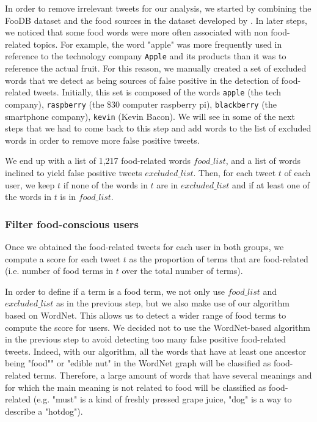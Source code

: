 \documentclass[letterpaper]{article}
\begin{document}
In order to remove irrelevant tweets for our analysis, we started by combining
the FooDB dataset and the food sources in the dataset developed by
\citeauthor{abbar2015you}. In later steps, we noticed that some food words were
more often associated with non food-related topics. For example, the word
"apple" was more frequently used in reference to the technology company
\verb+Apple+ and its products than it was to reference the actual fruit. For
this reason, we manually created a set of excluded words that we detect as being
sources of false positive in the detection of food-related tweets. Initially,
this set is composed of the words \verb+apple+ (the tech company),
\verb+raspberry+ (the \$30 computer raspberry pi), \verb+blackberry+ (the
smartphone company), \verb+kevin+ (Kevin Bacon). We will see in some of the next
steps that we had to come back to this step and add words to the list of
excluded words in order to remove more false positive tweets.

We end up with a list of 1,217 food-related words $food\_list$, and a list of words
inclined to yield false positive tweets $excluded\_list$. Then, for each tweet $t$ of each user, we keep $t$ if none of the words in $t$ are in $excluded\_list$ and if at least one of the words in $t$ is in $food\_list$.

\subsubsection{Filter food-conscious users}

Once we obtained the food-related tweets for each user in both groups, we
compute a score for each tweet $t$ as the proportion of terms that are
food-related (i.e. number of food terms in $t$ over the total number of terms).

In order to define if a term is a food term, we not only use $food\_list$ and
$excluded\_list$ as in the previous step, but we also make use of our algorithm
based on WordNet. This allows us to detect a wider range of food terms to
compute the score for users. We decided not to use the WordNet-based algorithm
in the previous step to avoid detecting too many false positive food-related
tweets. Indeed, with our algorithm, all the words that have at least one
ancestor being "food"" or "edible nut" in the WordNet graph will be classified
as food-related terms. Therefore, a large amount of words that have several
meanings and for which the main meaning is not related to food will be
classified as food-related (e.g. "must" is a kind of freshly pressed grape
juice, "dog" is a way to describe a "hotdog").
\end{document}
